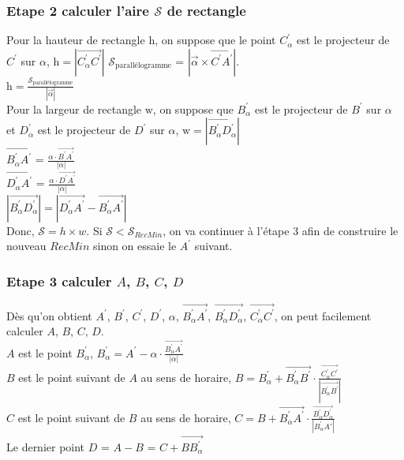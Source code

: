 \documentclass[14px]{article}
\begin{document}
\subsubsection{Etape 2 calculer l'aire $\mathcal{S}$ de rectangle}
Pour la hauteur de rectangle $\mathrm{h}$, on suppose que le point $C^{\prime}_{\alpha}$ est le projecteur de $C^{\prime}$ sur $\alpha$, $\mathrm{h}= |\overrightarrow{C^{\prime}_{\alpha}C^{\prime}}|$
$\mathcal{S}_{\text{parallélogramme}}$ = $|\vec{\alpha}\times\overrightarrow{C^{\prime}A^{\prime}}|$. \\
$\mathrm{h} =  \frac{\mathcal{S}_{\text{parallélogramme}}}{|\vec{\alpha}|}$\\

Pour la largeur de rectangle $\mathrm{w}$, on suppose que $B^{\prime}_{\alpha}$ est le projecteur de $B^{\prime}$ sur $\alpha$ et $D^{\prime}_{\alpha}$ est le projecteur de $D^{\prime}$ sur $\alpha$, $\mathrm{w} = |\overrightarrow{B^{\prime}_{\alpha}D^{\prime}_{\alpha}}|$\\
$\overrightarrow{B^{\prime}_{\alpha}A^{\prime}}$ = $\frac{\alpha\cdot\overrightarrow{B^{\prime}A^{\prime}}}{|\alpha|}$\\
$\overrightarrow{D^{\prime}_{\alpha}A^{\prime}}$ = $\frac{\alpha\cdot\overrightarrow{D^{\prime}A^{\prime}}}{|\alpha|}$\\
$|\overrightarrow{B^{\prime}_{\alpha}D^{\prime}_{\alpha}}| = |\overrightarrow{D^{\prime}_{\alpha}A^{\prime}} - \overrightarrow{B^{\prime}_{\alpha}A^{\prime}}|$\\
Donc, $\mathcal{S} = h \times w$. Si $\mathcal{S} < \mathcal{S}_{RecMin}$, on va continuer à l'étape 3 afin de construire le nouveau $RecMin$ sinon on essaie le $A^{\prime}$ suivant.\\


\subsubsection{Etape 3 calculer $A$, $B$, $C$, $D$}
Dès qu’on obtient $A^{\prime}$,  $B^{\prime}$, $C^{\prime}$, $D^{\prime}$, $\alpha$, $\overrightarrow{B^{\prime}_{\alpha}A^{\prime}}$, $\overrightarrow{B^{\prime}_{\alpha}D^{\prime}_{\alpha}}$,
$\overrightarrow{C^{\prime}_{\alpha}C^{\prime}}$, on peut facilement calculer $A$, $B$, $C$, $D$.\\
$A$ est le point $B^{\prime}_{\alpha}$, $B^{\prime}_{\alpha} = A^{\prime} - \alpha\cdot\frac{\overrightarrow{B^{\prime}_{\alpha}A^{\prime}}}{|\alpha|}$\\
$B$ est le point suivant de $A$ au sens de horaire, $B =  B^{\prime}_{\alpha} +  \overrightarrow{B^{\prime}_{\alpha}B^{\prime}}\cdot\frac {\overrightarrow{C^{\prime}_{\alpha}C^{\prime}}}{|\overrightarrow{B^{\prime}_{\alpha}B^{\prime}}|}$\\
$C$ est le point suivant de $B$ au sens de horaire, $C = B + \overrightarrow{B^{\prime}_{\alpha}A^{\prime}}\cdot\frac{\overrightarrow{B^{\prime}_{\alpha}D^{\prime}_{\alpha}}}{|B^{\prime}_{\alpha}A{\prime}|}$\\
Le dernier point $D$ = $A - B$ = $C + \overrightarrow{BB^{\prime}_{\alpha}}$
\end{document}
